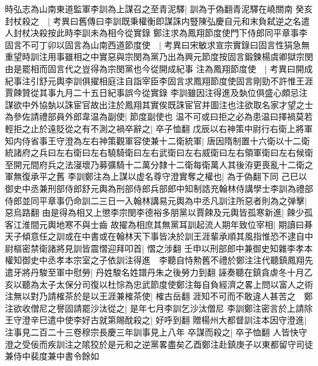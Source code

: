 時弘志為山南東道監軍李訓為上謀召之至青泥驛|{
	訓為于偽翻青泥驛在嶢關南}
癸亥封杖殺之　|{
	考異曰舊傳曰李訓既秉權衡即謀誅内豎陳弘慶自元和末負弑逆之名遣人封杖决殺按此時李訓未為相今從實錄}
鄭注求為鳳翔節度使門下侍郎同平章事李固言不可丁卯以固言為山南西道節度使　|{
	考異曰宋敏求宣宗實錄曰固言性狷急無重望時訓注用事雖相之中實惡與宗閔為黨乃出為興元節度按固言鍛鍊楊虞卿獄宗閔由是罷相而固言代之豈得為宗閔黨也今從開成紀事}
注為鳳翔節度使　|{
	考異曰開成紀事注引舒元輿李訓俱擢相庭注自詣宰臣李固言求鳳翔節度使固言剛勁不許惟王涯賈餗贊從其事九月二十五日紀事誤今從實錄}
李訓雖因注得進及埶位俱盛心頗忌注謀欲中外協埶以誅宦官故出注於鳳翔其實俟既誅宦官并圖注也注欲取名家才望之士為參佐請禮部員外郎韋温為副使|{
	節度副使也}
温不可或曰拒之必為患温曰擇禍莫若輕拒之止於遠貶從之有不測之禍卒辭之|{
	卒子恤翻}
戊辰以右神策中尉行右衛上將軍知内侍省事王守澄為左右神策觀軍容使兼十二衛統軍|{
	唐因隋制置十六衛以十二衛統諸府之兵曰左右衛曰左右驍騎衛曰左右武衛曰左右威衛曰左右領軍衛曰左右候衛至開元間府兵之法寖壞乃募彍騎十二萬分隸十二衛每衛萬人其後洊更喪亂十二衛之軍無復承平之舊}
李訓鄭注為上謀以虚名尊守澄實奪之權也|{
	為于偽翻下同}
己巳以御史中丞兼刑部侍郎舒元輿為刑部侍郎兵部郎中知制誥充翰林侍講學士李訓為禮部侍郎並同平章事仍命訓二三日一入翰林講易元輿為中丞凡訓注所惡者則為之弹擊|{
	惡烏路翻}
由是得為相又上懲李宗閔李德裕多朋黨以賈餗及元輿皆孤寒新進|{
	餗少孤客江淮間元輿地寒不與士齒}
故擢為相庶其無黨耳訓起流人期年致位宰相|{
	期讀曰朞}
天子傾意任之訓或在中書或在翰林天下事皆决於訓王涯輩承順其風指惟恐不逮自中尉樞密禁衛諸將見訓皆震慴迎拜叩首|{
	慴之涉翻}
壬申以刑部郎中兼御史知雜李孝本權知御史中丞孝本宗室之子依訓注得進　李聽自恃勲舊不禮於鄭注注代聽鎮鳳翔先遣牙將丹駿至軍中慰勞|{
	丹姓駿名姓譜丹朱之後勞力到翻}
誣奏聽在鎮貪虐冬十月乙亥以聽為太子太保分司復以杜悰為忠武節度使鄭注每自負經濟之畧上問以富人之術注無以對乃請榷茶於是以王涯兼榷茶使|{
	榷古岳翻}
涯知不可而不敢違人甚苦之　鄭注欲收僧尼之譽固請罷沙汰從之|{
	是年七月李訓乞沙汰僧尼}
李訓鄭注密言於上請除王守澄辛巳遣中使李好古就第賜酖殺之|{
	好呼到翻}
贈楊州大都督訓注本因守澄進|{
	注事見二百二十三卷穆宗長慶三年訓事見上八年}
卒謀而殺之|{
	卒子恤翻}
人皆快守澄之受佞而疾訓注之隂狡於是元和之逆黨畧盡矣乙酉鄭注赴鎮庚子以東都留守司徒兼侍中裴度兼中書令餘如

